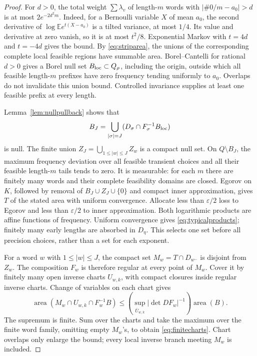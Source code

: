 \documentclass[11pt]{amsart}
\theoremstyle{definition}
\theoremstyle{remark}
\newcommand{\area}{\operatorname{area}}
\numberwithin{equation}{section}
\begin{document}
\begin{proof}
For \(d>0\), the total weight \(\sum\lambda_v\) of length-\(m\)
words with \(|\#0/m-a_0|>d\) is at most \(2e^{-2d^2m}\).
Indeed, for a Bernoulli variable \(X\) of mean \(a_0\),
the second derivative of
\(\log\mathbb E e^{t(X-a_0)}\) is a tilted variance, at most
\(1/4\). Its value and derivative at zero vanish, so it is at most
\(t^2/8\). Exponential Markov with \(t=4d\) and \(t=-4d\)
gives the bound.
By \eqref{eq:striparea}, the unions of the corresponding complete
local feasible regions have summable area. Borel--Cantelli for
rational \(d>0\) gives a Borel null set \(B_{\rm loc}\subset Q_\rho\),
including the origin, outside which all feasible length-\(m\)
prefixes have zero frequency tending uniformly to \(a_0\).
Overlaps do not invalidate this union bound. Controlled invariance
supplies at least one feasible prefix at every length.

Lemma~\ref{lem:nullpullback} shows that
\[
B_J=\bigcup_{|\sigma|=J}
       (D_\sigma\cap F_\sigma^{-1}B_{\rm loc})
\]
is null. The finite union
\(Z_J=\bigcup_{1\le|w|\le J}Z_w\) is a compact null set.
On \(Q\setminus B_J\), the maximum frequency deviation over all
feasible transient choices and all their feasible length-\(m\)
tails tends to zero. It is measurable: for each \(m\) there are
finitely many words and their complete feasibility domains are
closed. Egorov on \(K\), followed by removal of
\(B_J\cup Z_J\cup\{0\}\) and compact inner approximation,
gives \(T\) of the stated area with uniform convergence.
Allocate less than \(\varepsilon/2\) loss to Egorov and less than
\(\varepsilon/2\) to inner approximation.
Both logarithmic products are affine functions of frequency.
Uniform convergence gives \eqref{eq:typicalproducts}; finitely many
early lengths are absorbed in \(D_{\eta}\). This selects one set before
all precision choices, rather than a set for each exponent.

For a word \(w\) with \(1\le|w|\le J\), the compact set
\(M_w=T\cap D_{w^-}\) is disjoint from \(Z_w\).
The composition \(F_w\) is therefore regular at every point of
\(M_w\). Cover it by finitely many open inverse charts \(U_{w,k}\),
with compact closures inside regular inverse charts. Change of
variables on each chart gives
\[
\area(M_w\cap U_{w,k}\cap F_w^{-1}B)
\le
\left(\sup_{\overline U_{w,k}}|\det DF_w|^{-1}\right)\area(B).
\]
The supremum is finite. Sum over the charts and take the maximum
over the finite word family, omitting empty \(M_w\)'s, to obtain
\eqref{eq:finitecharts}. Chart overlaps only enlarge the bound;
every local inverse branch meeting \(M_w\) is included.
\end{proof}
\end{document}

